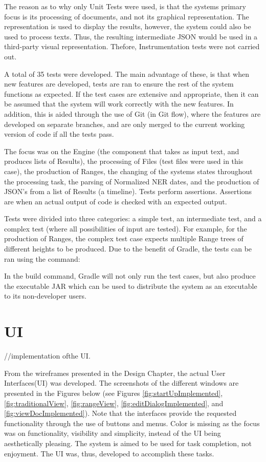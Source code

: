 \par The reason as to why only Unit Tests were used, is that the systems primary focus is its processing of documents, and not its graphical representation. The representation is used to display the results, however, the system could also be used to process texts. Thus, the resulting intermediate JSON would be used in a third-party visual representation. Thefore, Instrumentation tests were not carried out.

\par A total of 35 tests were developed. The main advantage of these, is that when new features are developed, tests are ran to ensure the rest of the system functions as expected. If the test cases are extensive and appropriate, then it can be assumed that the system will work correctly with the new features. In addition, this is aided through the use of Git (in Git flow), where the features are developed on separate branches, and are only merged to the current working version of code if all the tests pass.

\par The focus was on the Engine (the component that takes as input text, and produces lists of Results), the processing of Files (test files were used in this case), the production of Ranges, the changing of the systems states throughout the processing task, the parsing of Normalized NER dates, and the production of JSON's from a list of Results (a timeline). Tests perform assertions. Assertions are when an actual output of code is checked with an expected output.

\par Tests were divided into three categories: a simple test, an intermediate test, and a complex test (where all possibilities of input are tested). For example, for the production of Ranges, the complex test case expects multiple Range trees of different heights to be produced. Due to the benefit of Gradle, the tests can be ran using the command:\par
{}
In the build command, Gradle will not only run the test cases, but also produce the executable JAR which can be used to distribute the system as an executable to its non-developer users.

\section{UI}
//implementation ofthe UI.
\par From the wireframes presented in the Design Chapter, the actual User Interfaces(UI) was developed. The screenshots of the different windows are presented in the Figures below (see Figures \ref{fig:startUpImplemented}, \ref{fig:traditionalView}, \ref{fig:rangeView}, \ref{fig:editDialogImplemented}, and \ref{fig:viewDocImplemented}). Note that the interfaces provide the requested functionality through the use of buttons and menus. Color is missing as the focus was on functionality, visibility and simplicity, instead of the UI being aesthetically pleasing. The system is aimed to be used for task completion, not enjoyment. The UI was, thus, developed to accomplish these tasks.


